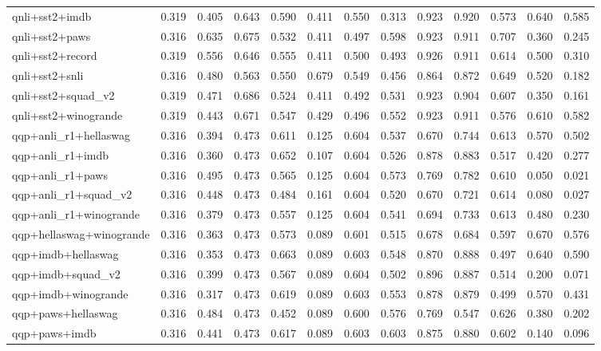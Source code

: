 \begin{table}[t]
\begin{tabular}{lrrrrrrrrrrrr}
    qnli+sst2+imdb & 0.319 & 0.405 & 0.643 & 0.590 & 0.411 & 0.550 & 0.313 & 0.923 & 0.920 & 0.573 & 0.640 & 0.585 \\
    qnli+sst2+paws & 0.316 & 0.635 & 0.675 & 0.532 & 0.411 & 0.497 & 0.598 & 0.923 & 0.911 & 0.707 & 0.360 & 0.245 \\
    qnli+sst2+record & 0.319 & 0.556 & 0.646 & 0.555 & 0.411 & 0.500 & 0.493 & 0.926 & 0.911 & 0.614 & 0.500 & 0.310 \\
    qnli+sst2+snli & 0.316 & 0.480 & 0.563 & 0.550 & 0.679 & 0.549 & 0.456 & 0.864 & 0.872 & 0.649 & 0.520 & 0.182 \\
    qnli+sst2+squad\_v2 & 0.319 & 0.471 & 0.686 & 0.524 & 0.411 & 0.492 & 0.531 & 0.923 & 0.904 & 0.607 & 0.350 & 0.161 \\
    qnli+sst2+winogrande & 0.319 & 0.443 & 0.671 & 0.547 & 0.429 & 0.496 & 0.552 & 0.923 & 0.911 & 0.576 & 0.610 & 0.582 \\
    qqp+anli\_r1+hellaswag & 0.316 & 0.394 & 0.473 & 0.611 & 0.125 & 0.604 & 0.537 & 0.670 & 0.744 & 0.613 & 0.570 & 0.502 \\
    qqp+anli\_r1+imdb & 0.316 & 0.360 & 0.473 & 0.652 & 0.107 & 0.604 & 0.526 & 0.878 & 0.883 & 0.517 & 0.420 & 0.277 \\
    qqp+anli\_r1+paws & 0.316 & 0.495 & 0.473 & 0.565 & 0.125 & 0.604 & 0.573 & 0.769 & 0.782 & 0.610 & 0.050 & 0.021 \\
    qqp+anli\_r1+squad\_v2 & 0.316 & 0.448 & 0.473 & 0.484 & 0.161 & 0.604 & 0.520 & 0.670 & 0.721 & 0.614 & 0.080 & 0.027 \\
    qqp+anli\_r1+winogrande & 0.316 & 0.379 & 0.473 & 0.557 & 0.125 & 0.604 & 0.541 & 0.694 & 0.733 & 0.613 & 0.480 & 0.230 \\
    qqp+hellaswag+winogrande & 0.316 & 0.363 & 0.473 & 0.573 & 0.089 & 0.601 & 0.515 & 0.678 & 0.684 & 0.597 & 0.670 & 0.576 \\
    qqp+imdb+hellaswag & 0.316 & 0.353 & 0.473 & 0.663 & 0.089 & 0.603 & 0.548 & 0.870 & 0.888 & 0.497 & 0.640 & 0.590 \\
    qqp+imdb+squad\_v2 & 0.316 & 0.399 & 0.473 & 0.567 & 0.089 & 0.604 & 0.502 & 0.896 & 0.887 & 0.514 & 0.200 & 0.071 \\
    qqp+imdb+winogrande & 0.316 & 0.317 & 0.473 & 0.619 & 0.089 & 0.603 & 0.553 & 0.878 & 0.879 & 0.499 & 0.570 & 0.431 \\
    qqp+paws+hellaswag & 0.316 & 0.484 & 0.473 & 0.452 & 0.089 & 0.600 & 0.576 & 0.769 & 0.547 & 0.626 & 0.380 & 0.202 \\
    qqp+paws+imdb & 0.316 & 0.441 & 0.473 & 0.617 & 0.089 & 0.603 & 0.603 & 0.875 & 0.880 & 0.602 & 0.140 & 0.096 \\

\end{tabular}
\end{table}
